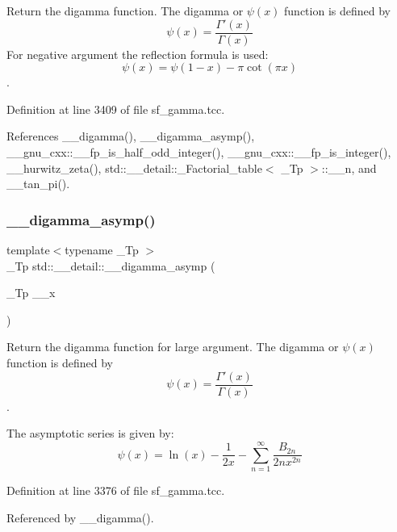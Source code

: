 Return the digamma function. The digamma or $ \psi(x) $ function is defined by \[ \psi(x) = \frac{\Gamma'(x)}{\Gamma(x)} \] For negative argument the reflection formula is used\+: \[ \psi(x) = \psi(1-x) - \pi \cot(\pi x) \]. 



Definition at line 3409 of file sf\+\_\+gamma.\+tcc.



References \+\_\+\+\_\+digamma(), \+\_\+\+\_\+digamma\+\_\+asymp(), \+\_\+\+\_\+gnu\+\_\+cxx\+::\+\_\+\+\_\+fp\+\_\+is\+\_\+half\+\_\+odd\+\_\+integer(), \+\_\+\+\_\+gnu\+\_\+cxx\+::\+\_\+\+\_\+fp\+\_\+is\+\_\+integer(), \+\_\+\+\_\+hurwitz\+\_\+zeta(), std\+::\+\_\+\+\_\+detail\+::\+\_\+\+Factorial\+\_\+table$<$ \+\_\+\+Tp $>$\+::\+\_\+\+\_\+n, and \+\_\+\+\_\+tan\+\_\+pi().

\mbox{\label{namespacestd_1_1____detail_a5264ad32c92b701acb90b543a1a96521}} 
\subsubsection{\texorpdfstring{\+\_\+\+\_\+digamma\+\_\+asymp()}{\_\_digamma\_asymp()}}
{\footnotesize\ttfamily template$<$typename \+\_\+\+Tp $>$ \\
\+\_\+\+Tp std\+::\+\_\+\+\_\+detail\+::\+\_\+\+\_\+digamma\+\_\+asymp (\begin{DoxyParamCaption}\item[{\+\_\+\+Tp}]{\+\_\+\+\_\+x }\end{DoxyParamCaption})}



Return the digamma function for large argument. The digamma or $ \psi(x) $ function is defined by \[ \psi(x) = \frac{\Gamma'(x)}{\Gamma(x)} \]. 

The asymptotic series is given by\+: \[ \psi(x) = \ln(x) - \frac{1}{2x} - \sum_{n=1}^{\infty} \frac{B_{2n}}{2 n x^{2n}} \] 

Definition at line 3376 of file sf\+\_\+gamma.\+tcc.



Referenced by \+\_\+\+\_\+digamma().

\mbox{\label{namespacestd_1_1____detail_ae9d54f73a3e05c2b242e992a0a93d5de}} 
